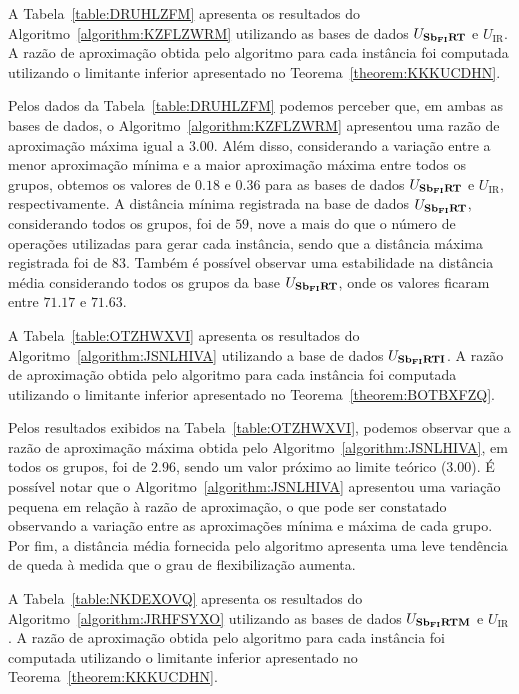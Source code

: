 A Tabela~\ref{table:DRUHLZFM} apresenta os resultados do Algoritmo~\ref{algorithm:KZFLZWRM} utilizando as bases de dados $U_{\textbf{Sb\textsubscript{FI}RT}}{}$ e $U_{\text{IR}}$. A razão de aproximação obtida pelo algoritmo para cada instância foi computada utilizando o limitante inferior apresentado no Teorema~\ref{theorem:KKKUCDHN}.



Pelos dados da Tabela~\ref{table:DRUHLZFM} podemos perceber que, em ambas as bases de dados, o Algoritmo~\ref{algorithm:KZFLZWRM} apresentou uma razão de aproximação máxima igual a $3.00$. Além disso, considerando a variação entre a menor aproximação mínima e a maior aproximação máxima entre todos os grupos, obtemos os valores de $0.18$ e $0.36$ para as bases de dados $U_{\textbf{Sb\textsubscript{FI}RT}}{}$ e $U_{\text{IR}}$, respectivamente. A distância mínima registrada na base de dados $U_{\textbf{Sb\textsubscript{FI}RT}}{}$, considerando todos os grupos, foi de $59$, nove a mais do que o número de operações utilizadas para gerar cada instância, sendo que a distância máxima registrada foi de $83$. Também é possível observar uma estabilidade na distância média considerando todos os grupos da base $U_{\textbf{Sb\textsubscript{FI}RT}}{}$, onde os valores ficaram entre $71.17$ e $71.63$.

A Tabela~\ref{table:OTZHWXVI} apresenta os resultados do Algoritmo~\ref{algorithm:JSNLHIVA} utilizando a base de dados $U_{\textbf{Sb\textsubscript{FI}RTI}}{}$. A razão de aproximação obtida pelo algoritmo para cada instância foi computada utilizando o limitante inferior apresentado no Teorema~\ref{theorem:BOTBXFZQ}.



Pelos resultados exibidos na Tabela~\ref{table:OTZHWXVI}, podemos observar que a razão de aproximação máxima obtida pelo Algoritmo~\ref{algorithm:JSNLHIVA}, em todos os grupos, foi de $2.96$, sendo um valor próximo ao limite teórico ($3.00$). É possível notar que o Algoritmo~\ref{algorithm:JSNLHIVA} apresentou uma variação pequena em relação à razão de aproximação, o que pode ser constatado observando a variação entre as aproximações mínima e máxima de cada grupo. Por fim, a distância média fornecida pelo algoritmo apresenta uma leve tendência de queda à medida que o grau de flexibilização aumenta.

A Tabela~\ref{table:NKDEXOVQ} apresenta os resultados do Algoritmo~\ref{algorithm:JRHFSYXO} utilizando as bases de dados $U_{\textbf{Sb\textsubscript{FI}RTM}}{}$ e $U_{\text{IR}}$. A razão de aproximação obtida pelo algoritmo para cada instância foi computada utilizando o limitante inferior apresentado no Teorema~\ref{theorem:KKKUCDHN}.

